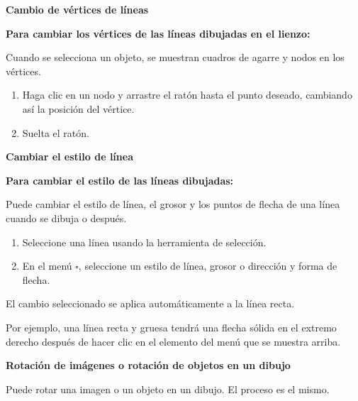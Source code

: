 


\textbf{Cambio de vértices de líneas}

\textbf{Para cambiar los vértices de las líneas dibujadas en el lienzo:}

Cuando se selecciona un objeto, se muestran cuadros de agarre y nodos en los vértices.




\begin{enumerate}
  \item Haga clic en un nodo y arrastre el ratón hasta el punto deseado, cambiando así la posición del vértice.

\item Suelta el ratón.
\end{enumerate}

\textbf{Cambiar el estilo de línea}

\textbf{Para cambiar el estilo de las líneas dibujadas:}

Puede cambiar el estilo de línea, el grosor y los puntos de flecha de una línea cuando se dibuja o después.

\begin{enumerate}
  \item Seleccione una línea usando la herramienta de selección.

\item En el menú $\square$, seleccione un estilo de línea, grosor o dirección y forma de flecha.
\end{enumerate}


El cambio seleccionado se aplica automáticamente a la línea recta.

Por ejemplo, una línea recta y gruesa tendrá una flecha sólida en el extremo derecho después de hacer clic en el elemento del menú que se muestra arriba.


\textbf{Rotación de imágenes o rotación de objetos en un dibujo}

Puede rotar una imagen o un objeto en un dibujo. El proceso es el mismo.


